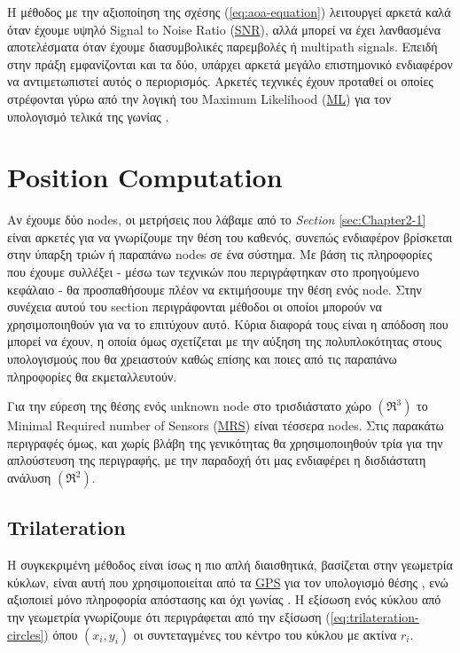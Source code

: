 Η μέθοδος με την αξιοποίηση της σχέσης (\ref{eq:aoa-equation}) λειτουργεί αρκετά καλά όταν έχουμε υψηλό Signal to Noise Ratio (\hyperref[abbr:SNR]{SNR}),
αλλά μπορεί να έχει λανθασμένα αποτελέσματα όταν έχουμε διασυμβολικές παρεμβολές ή multipath signals. 
Επειδή στην πράξη εμφα\-νί\-ζονται και τα δύο, υπάρχει αρκετά μεγάλο επιστημονικό ενδιαφέρον να αντι\-με\-τω\-πι\-στεί αυτός ο περιορισμός.
Αρκετές τεχνικές έχουν προταθεί οι οποίες στρέφονται γύρω από την λογική του Maximum Likelihood (\hyperref[abbr:ML]{ML})
για τον υπολογισμό τελικά της γωνίας \cite{wsn-Localization-techniques}.

\section{Position Computation} \label{sec:Chapter2-2} 
Αν έχουμε δύο nodes, οι μετρήσεις που λάβαμε από το \emph{Section} \ref{sec:Chapter2-1} είναι αρκετές για να γνωρίζουμε την θέση του καθενός,
συνεπώς ενδιαφέρον βρίσκεται στην ύπαρξη τριών ή παραπάνω nodes σε ένα σύστημα. Με βάση τις πληροφορίες που έχουμε συλλέξει - μέσω των τεχνικών που 
περιγράφτηκαν στο προηγούμενο κεφάλαιο - θα προσπαθήσουμε πλέον να εκτιμήσουμε την θέση ενός node. Στην συνέχεια αυτού του section περιγράφονται μέθοδοι οι οποίοι μπορούν να χρησιμοποιηθούν για να το επιτύχουν
αυτό. Κύρια διαφορά τους είναι η απόδοση που μπορεί να έχουν, η οποία όμως σχετίζεται με την αύξηση της πολυπλοκότητας στους υπολογισμούς που θα
χρειαστούν καθώς επίσης και ποιες από τις παραπάνω πληροφορίες θα εκμεταλλευτούν. 

Για την εύρεση της θέσης ενός unknown node στο τρισδιάστατο χώρο $(\mathfrak{R}^3)$ το Minimal Required number of Sensors (\hyperref[abbr:MRS]{MRS}) είναι τέσσερα nodes.
Στις παρακάτω περιγραφές όμως, και χωρίς βλάβη της γενικότητας θα χρησιμοποιηθούν τρία για την απλούστευση της περιγραφής, με την παραδοχή ότι μας
ενδιαφέρει η δισδιάστατη ανάλυση $(\mathfrak{R}^2)$.

\subsection{Trilateration}
Η συγκεκριμένη μέθοδος είναι ίσως η πιο απλή διαισθητικά, βασίζεται στην γεωμετρία κύκλων, είναι αυτή που χρησιμοποιείται από τα \hyperref[abbr:GPS]{GPS}
για τον υπολογισμό θέσης \cite{trilateration-vs-triangulation-video}, ενώ αξιοποιεί μόνο πληροφορία απόστασης και όχι γωνίας \cite{Trilateration-vs-Triangulation}.
Η εξίσωση ενός κύκλου από την γεωμετρία γνωρίζουμε ότι περιγράφεται από την εξίσωση (\ref{eq:trilateration-circles}) όπου $(x_i,y_i)$ οι συντεταγμένες
του κέντρο του κύκλου με ακτίνα $r_i$.

